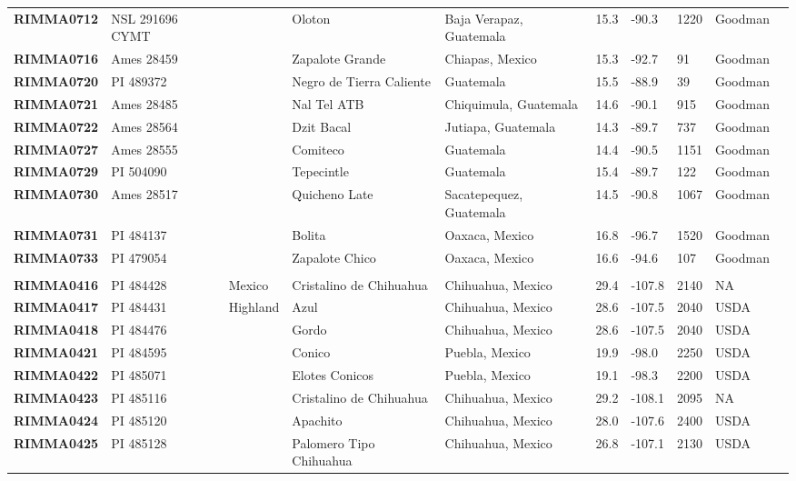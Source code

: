 \begin{table}[h]
\begin{center}
{\begin{tabular}{llllllllll}
{\bf RIMMA0712}	&	NSL 291696 CYMT	&		&	Oloton	&	Baja Verapaz, Guatemala	&	15.3 	&	-90.3 	&	1220	&	Goodman	\\
{\bf RIMMA0716}	&	Ames 28459	&		&	Zapalote Grande	&	Chiapas, Mexico	&	15.3 	&	-92.7 	&	91	&	Goodman	\\
{\bf RIMMA0720}	&	PI 489372	&		&	Negro de Tierra Caliente	&	Guatemala	&	15.5 	&	-88.9 	&	39	&	Goodman	\\
{\bf RIMMA0721}	&	Ames 28485	&		&	Nal Tel ATB	&	Chiquimula, Guatemala	&	14.6 	&	-90.1 	&	915	&	Goodman	\\
{\bf RIMMA0722}	&	Ames 28564	&		&	Dzit Bacal	&	Jutiapa, Guatemala	&	14.3 	&	-89.7 	&	737	&	Goodman	\\
{\bf RIMMA0727}	&	Ames 28555	&		&	Comiteco	&	Guatemala	&	14.4 	&	-90.5 	&	1151	&	Goodman	\\
{\bf RIMMA0729}	&	PI 504090	&		&	Tepecintle	&	Guatemala	&	15.4 	&	-89.7 	&	122	&	Goodman	\\
{\bf RIMMA0730}	&	Ames 28517	&		&	Quicheno Late	&	Sacatepequez, Guatemala	&	14.5 	&	-90.8 	&	1067	&	Goodman	\\
{\bf RIMMA0731}	&	PI 484137	&		&	Bolita	&	Oaxaca, Mexico	&	16.8 	&	-96.7 	&	1520	&	Goodman	\\
{\bf RIMMA0733}	&	PI 479054	&		&	Zapalote Chico	&	Oaxaca, Mexico	&	16.6 	&	-94.6 	&	107	&	Goodman	\\
	\hline 
	& & & \\[-4mm] 
{\bf RIMMA0416}	&	PI 484428	&	Mexico	&	Cristalino de Chihuahua	&	Chihuahua, Mexico	&	29.4 	&	-107.8 	&	2140	&	NA	\\
{\bf RIMMA0417}	&	PI 484431	&	Highland	&	Azul	&	Chihuahua, Mexico	&	28.6 	&	-107.5 	&	2040	&	USDA	\\
{\bf RIMMA0418}	&	PI 484476	&		&	Gordo	&	Chihuahua, Mexico	&	28.6 	&	-107.5 	&	2040	&	USDA	\\
{\bf RIMMA0421}	&	PI 484595	&		&	Conico	&	Puebla, Mexico	&	19.9 	&	-98.0 	&	2250	&	USDA	\\
{\bf RIMMA0422}	&	PI 485071	&		&	Elotes Conicos	&	Puebla, Mexico	&	19.1 	&	-98.3 	&	2200	&	USDA	\\
{\bf RIMMA0423}	&	PI 485116	&		&	Cristalino de Chihuahua	&	Chihuahua, Mexico	&	29.2 	&	-108.1 	&	2095	&	NA	\\
{\bf RIMMA0424}	&	PI 485120	&		&	Apachito	&	Chihuahua, Mexico	&	28.0 	&	-107.6 	&	2400	&	USDA	\\
{\bf RIMMA0425}	&	PI 485128	&		&	Palomero Tipo Chihuahua	&	Chihuahua, Mexico	&	26.8 	&	-107.1 	&	2130	&	USDA	\\

\end{tabular}}
\end{center}
\end{table}
